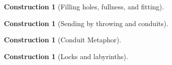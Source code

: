 \documentclass{tufte-handout}
\theoremstyle{definition}
\newtheorem{construction}[theorem]{Construction}
\begin{document}
\begin{construction}[Filling holes, fullness, and fitting]

\end{construction}

\begin{construction}[Sending by throwing and conduits]

\end{construction}

\begin{construction}[Conduit Metaphor]

\end{construction}

\begin{construction}[Locks and labyrinths]

\end{construction}
\end{document}
